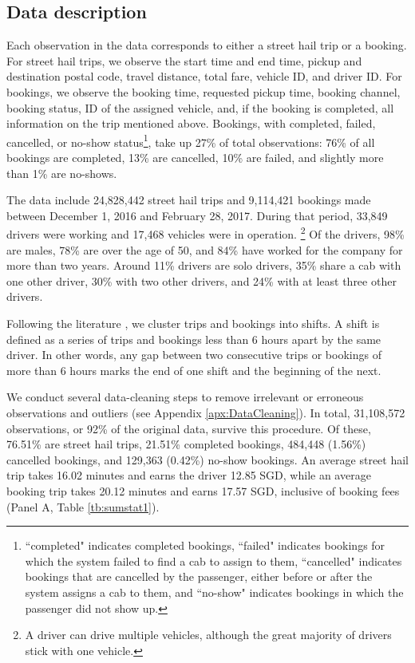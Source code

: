 \documentclass[reviewmode]{restat}
\begin{document}
\subsection{Data description}
Each observation in the data corresponds to either a street hail trip or a booking. For street hail trips, 
we observe the start time and end time, pickup and destination postal code, 
travel distance, total fare, vehicle ID, and driver ID. For bookings, we observe the booking time, 
requested pickup time, booking channel, booking status,  ID of the assigned vehicle, and, if the booking
is completed, all information on the trip mentioned above. Bookings, with completed, failed, cancelled, 
or no-show status\footnote{``completed" indicates completed bookings, ``failed" indicates bookings for
which the system failed to find a cab to assign to them, ``cancelled" indicates bookings that are cancelled
by the passenger, either before or after the system assigns a cab to them, and ``no-show" indicates bookings 
in which the passenger did not show up.}, take up 27\% of  total observations: 76\% of all bookings are 
completed, 13\% are cancelled, 10\% are failed, and slightly more than 1\% are no-shows.

The data include 24,828,442 street hail trips and 9,114,421 bookings made between December 1, 2016 and
February 28, 2017. During that period, 33,849 drivers were working and 17,468 vehicles were in operation.%
\footnote{A driver can drive multiple vehicles, although the great majority of drivers stick with one vehicle.} 
Of the drivers, 98\% are males, 78\% are over the age of 50, and 84\% have worked for the company for more than
two years. Around 11\% drivers are solo drivers, 35\% share a cab with one other driver, 30\% with two other 
drivers, and 24\% with at least three other drivers.

Following the literature \citep{farber2015you,agarwal2015singaporean,martin2017quit,chen2015dynamic}, we 
cluster trips and bookings into shifts. A shift is defined as a series of trips and bookings less than 6 
hours apart by the same driver. In other words, any gap between two consecutive trips or bookings of more
than 6 hours marks the end of one shift and the beginning of the next. 

We conduct several data-cleaning steps to remove irrelevant or erroneous observations and outliers (see Appendix \ref{apx:DataCleaning}).
In total, 31,108,572 observations, or 92\% of the original data, survive this procedure. Of these, 76.51\% are
street hail trips, 21.51\% completed bookings, 484,448 (1.56\%) cancelled bookings, and 129,363 (0.42\%) no-show
bookings. An average street hail trip takes 16.02 minutes and earns the driver 12.85 SGD, while an average  
booking trip takes 20.12 minutes and earns 17.57 SGD, inclusive of booking fees (Panel A, Table \ref{tb:sumstat1}).
\end{document}
